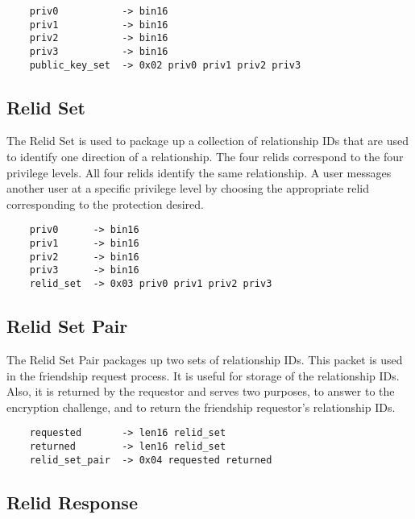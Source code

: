 \documentclass[letterpaper,11pt,oneside]{article}
\begin{document}
\vspace{10pt}
\begin{verbatim}
    priv0           -> bin16
    priv1           -> bin16
    priv2           -> bin16
    priv3           -> bin16
    public_key_set  -> 0x02 priv0 priv1 priv2 priv3
\end{verbatim}
\vspace{10pt}

\subsection{Relid Set}

The Relid Set is used to package up a collection of relationship IDs that are
used to identify one direction of a relationship. The four relids correspond to
the four privilege levels. All four relids identify the same relationship. A
user messages another user at a specific privilege level by choosing the
appropriate relid corresponding to the protection desired.

\vspace{10pt}
\begin{verbatim}
    priv0      -> bin16
    priv1      -> bin16
    priv2      -> bin16
    priv3      -> bin16
    relid_set  -> 0x03 priv0 priv1 priv2 priv3
\end{verbatim}
\vspace{10pt}

\subsection{Relid Set Pair}

The Relid Set Pair packages up two sets of relationship IDs. This packet is
used in the friendship request process. It is useful for storage of the
relationship IDs. Also, it is returned by the requestor and serves two
purposes, to answer to the encryption challenge, and to return the friendship
requestor's relationship IDs.

\vspace{10pt}
\begin{verbatim}
    requested       -> len16 relid_set
    returned        -> len16 relid_set
    relid_set_pair  -> 0x04 requested returned
\end{verbatim}
\vspace{10pt}

\subsection{Relid Response}
\end{document}
